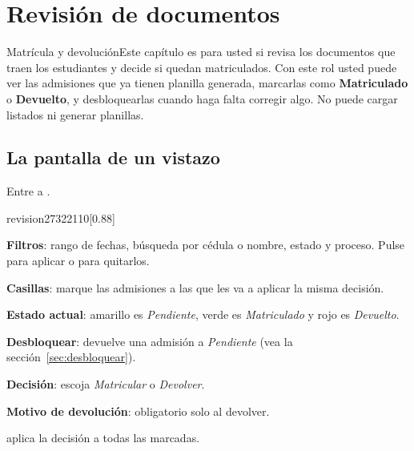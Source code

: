 \chapter{Revisión de documentos}\label{cap:revision}

\begin{ficharol}{Matrícula y devolución}{Este capítulo es para usted si revisa los
  documentos que traen los estudiantes y decide si quedan matriculados.}
Con este rol usted puede ver las admisiones que ya tienen planilla generada, marcarlas como
\textbf{Matriculado} o \textbf{Devuelto}, y desbloquearlas cuando haga falta corregir algo. No
puede cargar listados ni generar planillas.
\end{ficharol}

\section{La pantalla de un vistazo}

Entre a .

\begin{captura}{revision}{2732}{2110}[0.88\linewidth]
\end{captura}

\begin{leyenda}
  \item[1] \textbf{Filtros}: rango de fechas, búsqueda por cédula o nombre, estado y proceso.
        Pulse  para aplicar o  para quitarlos.
  \item[2] \textbf{Casillas}: marque las admisiones a las que les va a aplicar la misma
        decisión.
  \item[3] \textbf{Estado actual}: amarillo es \emph{Pendiente}, verde es \emph{Matriculado} y
        rojo es \emph{Devuelto}.
  \item[4] \textbf{Desbloquear}: devuelve una admisión a \emph{Pendiente} (vea
        la sección~\ref{sec:desbloquear}).
  \item[5] \textbf{Decisión}: escoja \emph{Matricular} o \emph{Devolver}.
  \item[6] \textbf{Motivo de devolución}: obligatorio solo al devolver.
  \item[7]  aplica la decisión a todas las marcadas.
\end{leyenda}

